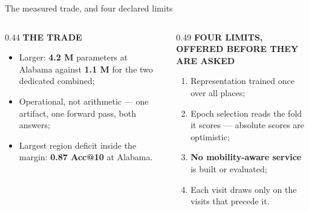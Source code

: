 \documentclass{beamer}
\begin{document}
\begin{frame}{The measured trade, and four declared limits}
    \small
    \begin{columns}[T,onlytextwidth]
        \begin{column}{0.44\textwidth}
            \textbf{\color{primaryshade}THE TRADE}\par\medskip
            \begin{itemize}
                \item Larger: \textbf{4.2 M} parameters at Alabama against \textbf{1.1 M} for
                      the two dedicated combined;
                \item \alert{Operational, not arithmetic} --- one artifact, one forward pass,
                      both answers;
                \item Largest region deficit inside the margin: \textbf{0.87 Acc@10} at Alabama.
            \end{itemize}
        \end{column}
        \hfill
        \begin{column}{0.49\textwidth}
            \textbf{\color{alertshade}FOUR LIMITS, OFFERED BEFORE THEY ARE ASKED}\par\medskip
            \begin{enumerate}
                \item Representation trained once over all places;
                \item Epoch selection reads the fold it scores --- \alert{absolute scores are
                      optimistic};
                \item \textbf{No mobility-aware service} is built or evaluated;
                \item Each visit draws only on the visits that precede it.
            \end{enumerate}
        \end{column}
    \end{columns}
\end{frame}

\end{document}
